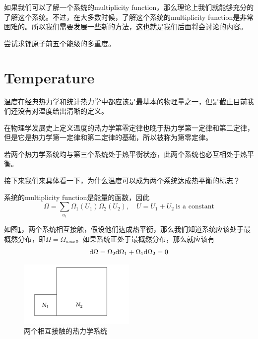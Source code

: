 如果我们可以了解一个系统的multiplicity function，那么理论上我们就能够充分的了解这个系统。不过，在大多数时候，了解这个系统的multiplicity function是非常困难的。所以我们需要发展一些新的方法，这也就是我们后面将会讨论的内容。
\begin{refquestion}
       尝试求锂原子前五个能级的多重度。
\end{refquestion}
\section{Temperature} %
\label{sec:temperature}
温度在经典热力学和统计热力学中都应该是最基本的物理量之一，但是截止目前我们还没有对温度给出清晰的定义。

在物理学发展史上定义温度的热力学第零定律也晚于热力学第一定律和第二定律，但是它是热力学第一定律和第二定律的基础，所以被称为第零定律。

\begin{law}[热力学第零定律]
       若两个热力学系统均与第三个系统处于热平衡状态，此两个系统也必互相处于热平衡。
\end{law}

接下来我们来具体看一下，为什么温度可以成为两个系统达成热平衡的标志？

系统的multiplicity function是能量的函数，因此\begin{equation}
       \Omega=\sum_{u_1} \Omega_1(U_1) \Omega_2(U_2),\quad U=U_1+U_2\  \text{is a constant}
\end{equation}

如图\ref{fig:temperature}，两个系统相互接触，假设他们达成热平衡，那么我们知道系统应该处于最概然分布，即$\Omega=\Omega_{max}$。如果系统正处于最概然分布，那么就应该有\begin{equation}
       \mathrm{d} \Omega=\Omega_2 \mathrm{d} \Omega_1+\Omega_1 \mathrm{d} \Omega_2=0
\end{equation}
\begin{figure}[h]
       \centering\includegraphics[width=0.5\textwidth]{fig/temperature.png}
       \caption{两个相互接触的热力学系统}
       \label{fig:temperature}
\end{figure}


